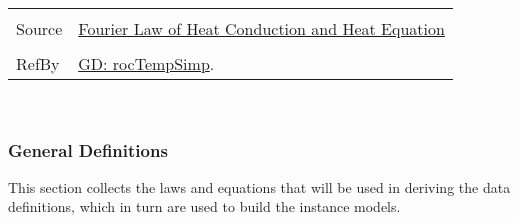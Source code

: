 \documentclass[12pt]{article}
\begin{document}
\begin{minipage}{\textwidth}
\begin{tabular}{p{} p{}}
\\ \midrule \\
Source & \hyperref[http://www.efunda.com/formulae/heat_transfer/conduction/overview_cond.cfm]{Fourier Law of Heat Conduction and Heat Equation}
\\ \midrule \\
RefBy & \hyperref[GD:rocTempSimp]{GD: rocTempSimp}.
\\ \bottomrule \end{tabular}
\end{minipage}\\
\subsubsection{General Definitions}
\label{Sec:GDs}
This section collects the laws and equations that will be used in deriving the data definitions, which in turn are used to build the instance models.
~\newline
\end{document}
